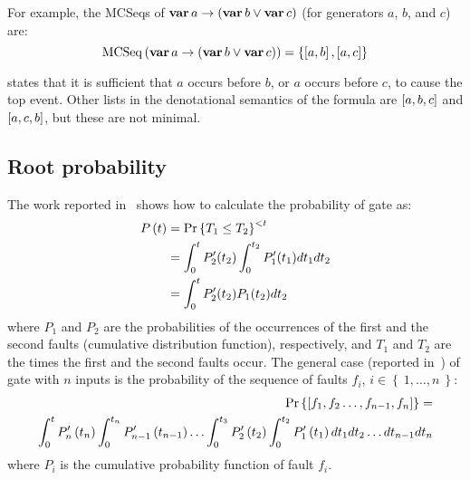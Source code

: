 For example, the \acp{MCSeq} of $\operatorname{\mathbf{var}} a \rightarrow \left(\operatorname{\mathbf{var}} b \lor \operatorname{\mathbf{var}} c\right)$ (for generators $a$, $b$, and $c$) are:
%
\begin{equation}
\operatorname{\mathrm{MCSeq}}\left(\operatorname{\mathbf{var}} a \rightarrow \left(\operatorname{\mathbf{var}} b \lor \operatorname{\mathbf{var}} c\right)\right) = \left\{ \left[ a,b \right], \left[ a,c \right] \right\}\label{eq:mcseq-a-and-b}
\end{equation}

 states that it is sufficient that $a$ occurs before $b$, or $a$ occurs before $c$, to cause the top event.
Other lists in the denotational semantics of the formula are $\left[ a,b,c \right]$ and $\left[ a,c,b \right]$, but these are not minimal.

\subsection{Root probability}

The work reported in~\cite{Merle2010} shows how to calculate the probability of  gate as:
%
\begin{align}
P\left(t\right) & = \Pr\left\{T_1 \le T_2 \right\}^{<t}\nonumber\\
& = \int_0^t P'_2(t_2) \int_0^{t_2} P'_1(t_1) dt_1 dt_2 \nonumber\\
& = \int_0^t P'_2(t_2) P_1(t_2) dt_2\label{eq:pand-probability}
\end{align}
%
where $P_1$ and $P_2$ are the probabilities of the occurrences of the first and the second faults (cumulative distribution function), respectively, and $T_1$ and $T_2$ are the times the first and the second faults occur.
The general case (reported in~\cite{FAR1976}) of  gate with $n$ inputs is the probability of the sequence of faults $f_i$, $i \in \left\{~1, \ldots, n~\right\}$:
%
\begin{align}
\Pr\left\{\left[f_1,f_2\ldots,f_{n-1},f_n\right]\right\} = \nonumber\\ \int_0^tP'_{n}\left(t_{n}\right)\int_0^{t_n}P'_{n-1}\left(t_{n-1}\right)\ldots\int_0^{t_3}P'_{2}\left(t_{2}\right)
 \int_0^{t_2}P'_{1}\left(t_{1}\right) dt_1 dt_2\ldots dt_{n-1}  dt_n\label{eq:general-pand-probability}
\end{align}
%
where $P_i$ is the cumulative probability function of fault $f_i$.

